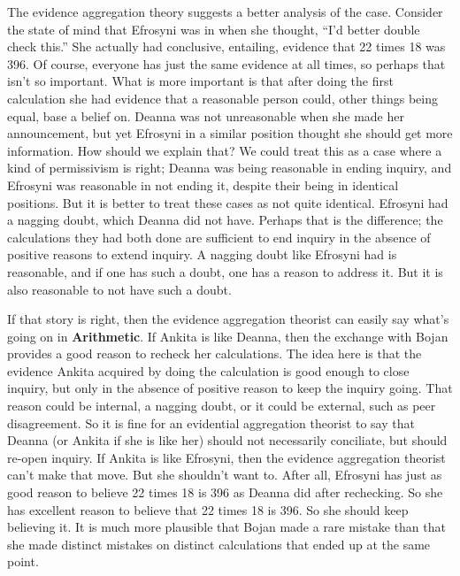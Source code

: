 \documentclass[
  10pt,
  letterpaper,
  twoside]{scrbook}
\begin{document}
The evidence aggregation theory suggests a better analysis of the case.
Consider the state of mind that {Efrosyni} was in when she thought,
``I'd better double check this.'' She actually had conclusive,
entailing, evidence that 22 times 18 was 396. Of course, everyone has
just the same evidence at all times, so perhaps that isn't so important.
What is more important is that after doing the first calculation she had
evidence that a reasonable person could, other things being equal, base
a belief on. {Deanna} was not unreasonable when she made her
announcement, but yet {Efrosyni} in a similar position thought she
should get more information. How should we explain that? We could treat
this as a case where a kind of permissivism is right; {Deanna} was being
reasonable in ending inquiry, and {Efrosyni} was reasonable in not
ending it, despite their being in identical positions. But it is better
to treat these cases as not quite identical. {Efrosyni} had a nagging
doubt, which {Deanna} did not have. Perhaps that is the difference; the
calculations they had both done are sufficient to end inquiry in the
absence of positive reasons to extend inquiry. A nagging doubt like
{Efrosyni} had is reasonable, and if one has such a doubt, one has a
reason to address it. But it is also reasonable to not have such a
doubt.

If that story is right, then the evidence aggregation theorist can
easily say what's going on in \textbf{Arithmetic}. If {Ankita} is like
{Deanna}, then the exchange with {Bojan} provides a good reason to
recheck her calculations. The idea here is that the evidence {Ankita}
acquired by doing the calculation is good enough to close inquiry, but
only in the absence of positive reason to keep the inquiry going. That
reason could be internal, a nagging doubt, or it could be external, such
as peer disagreement. So it is fine for an evidential aggregation
theorist to say that {Deanna} (or Ankita if she is like her) should not
necessarily conciliate, but should re-open inquiry. If {Ankita} is like
{Efrosyni}, then the evidence aggregation theorist can't make that move.
But she shouldn't want to. After all, {Efrosyni} has just as good reason
to believe 22 times 18 is 396 as {Deanna} did after rechecking. So she
has excellent reason to believe that 22 times 18 is 396. So she should
keep believing it. It is much more plausible that {Bojan} made a rare
mistake than that she made distinct mistakes on distinct calculations
that ended up at the same point.
\end{document}
